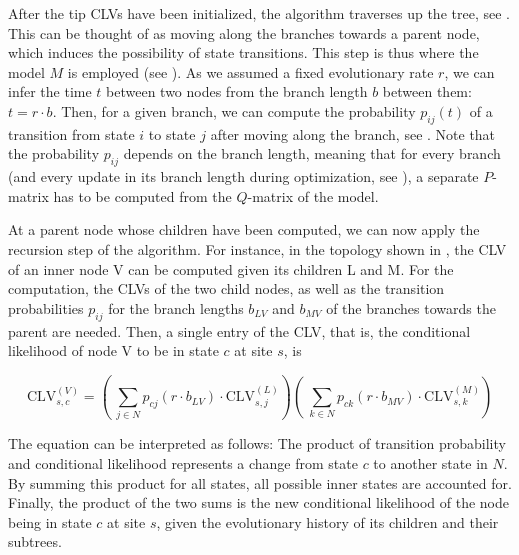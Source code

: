 After the tip CLVs have been initialized, the algorithm traverses up the tree, see .
This can be thought of as moving along the branches towards a parent node,
which induces the possibility of state transitions.
This step is thus where the model $M$ is employed (see ).
As we assumed a fixed evolutionary rate $r$,
we can infer the time $t$ between two nodes from the branch length $b$ between them: $t = r \cdot b$.
Then, for a given branch, we can compute the probability $p_{ij}(t)$ of a transition
from state $i$ to state $j$ after moving along the branch, see .
Note that the probability $p_{ij}$ depends on the branch length,
meaning that for every branch (and every update in its branch length during optimization,
see ),
a separate $P$-matrix has to be computed from the $Q$-matrix of the model.

At a parent node whose children have been computed, we can now apply the recursion step of the algorithm.
For instance, in the topology shown in , the CLV of an inner node {\sffamily V}
can be computed given its children {\sffamily L} and {\sffamily M}.
For the computation, the CLVs of the two child nodes,
as well as the transition probabilities $p_{ij}$ for the branch lengths $b_{LV}$ and $b_{MV}$
of the branches towards the parent are needed.
Then, a single entry of the CLV, that is,
the conditional likelihood of node {\sffamily V} to be in state $c$ at site $s$, is

\begin{equation}
    \label{ch:Foundations:sec:MLTreeInference:eq:CLV}
    \mbox{CLV}^{(V)}_{s,c} =
    \left(~ \sum_{j \in N} p_{cj}(r \cdot b_{LV}) \cdot \mbox{CLV}^{(L)}_{s,j} \right)
    \left(~ \sum_{k \in N} p_{ck}(r \cdot b_{MV}) \cdot \mbox{CLV}^{(M)}_{s,k} \right)
\end{equation}

The equation can be interpreted as follows:
The product of transition probability and conditional likelihood represents a change from state $c$ to another state in $N$.
By summing this product for all states, all possible inner states are accounted for.
Finally, the product of the two sums is the new conditional likelihood of the node being in state $c$ at site $s$,
given the evolutionary history of its children and their subtrees.

